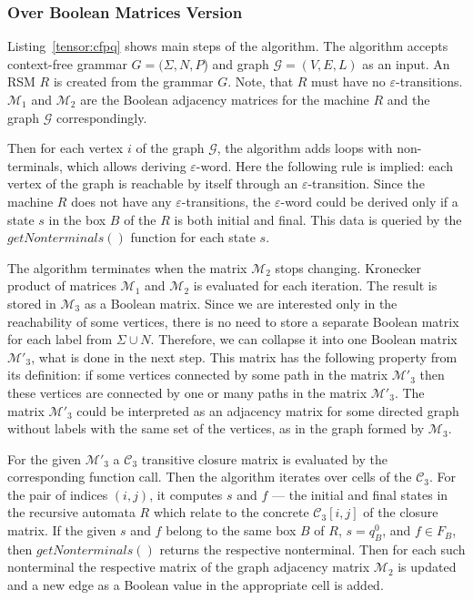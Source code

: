 
\subsubsection{Over Boolean Matrices Version}
Listing~\ref{tensor:cfpq} shows main steps of the algorithm.
The algorithm accepts context-free grammar $G=(\Sigma,N,P$) and graph $\mathcal{G}=(V,E,L)$ as an input.
An RSM $R$ is created from the grammar $G$.
Note, that $R$ must have no $\varepsilon$-transitions.
$\mathcal{M}_1$ and $\mathcal{M}_2$ are the Boolean adjacency matrices for the machine 
$R$ and the graph $\mathcal{G}$ correspondingly.

Then for each vertex $i$ of the graph $\mathcal{G}$, the algorithm adds loops 
with non-terminals, which allows deriving $\varepsilon$-word.
Here the following rule is implied: each vertex of the graph is reachable 
by itself through an $\varepsilon$-transition. Since the machine $R$ does 
not have any $\varepsilon$-transitions, the $\varepsilon$-word could be 
derived only if a state $s$ in the box $B$ of the $R$ is both initial and final.
This data is queried by the $getNonterminals()$ function for each state $s$.

The algorithm terminates when the matrix $\mathcal{M}_2$ stops changing.
Kronecker product of matrices $\mathcal{M}_1$ and $\mathcal{M}_2$ is evaluated
for each iteration.
The result is stored in $\mathcal{M}_3$ as a Boolean matrix. Since we are interested
only in the reachability of some vertices, there is no need to store a separate
Boolean matrix for each label from $\Sigma \cup N$. Therefore, we can 
collapse it into one Boolean matrix $\mathcal{M}'_3$, what is done in the next step.
This matrix has the following property from its definition: if some vertices 
connected by some path in the matrix $\mathcal{M}'_3$ then these vertices are
connected by one or many paths in the matrix $\mathcal{M}'_3$. The matrix 
$\mathcal{M}'_3$ could be interpreted as an adjacency matrix for some directed graph
without labels with the same set of the vertices, as in the graph formed by $\mathcal{M}_3$.

For the given $\mathcal{M}'_3$ a $\mathcal{C}_3$ transitive closure matrix
is evaluated by the corresponding function call. 
Then the algorithm iterates over cells of the $\mathcal{C}_3$.
For the pair of indices $(i,j)$, it computes $s$ and $f$ --- 
the initial and final states in the recursive automata $R$ which relate 
to the concrete $\mathcal{C}_3[i,j]$ of the closure matrix.
If the given $s$ and $f$ belong to the same box $B$ of $R$, $s = q_B^0$, 
and $f \in F_B$, then $getNonterminals()$ returns the respective nonterminal.
Then for each such nonterminal the respective matrix of the graph adjacency 
matrix $\mathcal{M}_2$ is updated and a new edge as a Boolean value in the 
appropriate cell is added.


